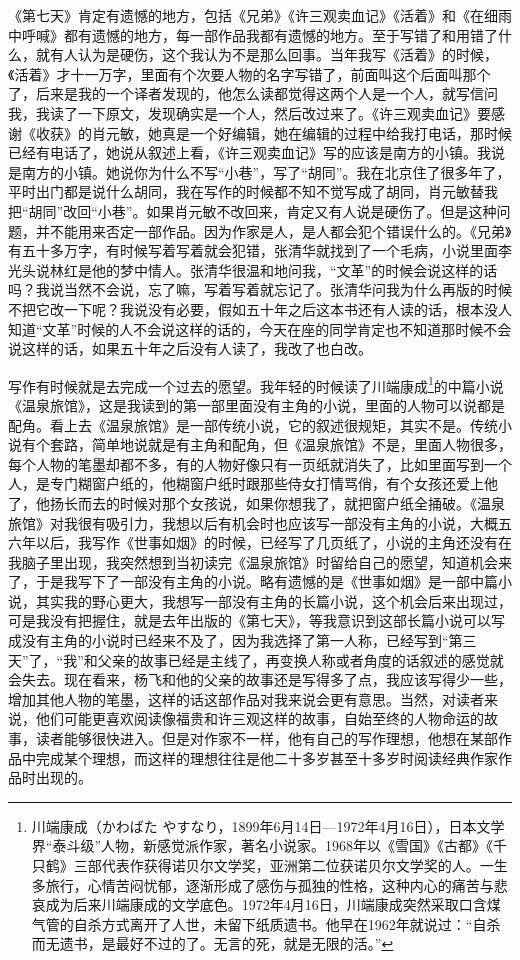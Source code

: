 \documentclass[fontset=fandol,12pt,a5paper]{ctexbook}
\begin{document}
《第七天》肯定有遗憾的地方，包括《兄弟》《许三观卖血记》《活着》和《在细雨中呼喊》都有遗憾的地方，每一部作品我都有遗憾的地方。至于写错了和用错了什么，就有人认为是硬伤，这个我认为不是那么回事。当年我写《活着》的时候，《活着》才十一万字，里面有个次要人物的名字写错了，前面叫这个后面叫那个了，后来是我的一个译者发现的，他怎么读都觉得这两个人是一个人，就写信问我，我读了一下原文，发现确实是一个人，然后改过来了。《许三观卖血记》要感谢《收获》的肖元敏，她真是一个好编辑，她在编辑的过程中给我打电话，那时候已经有电话了，她说从叙述上看，《许三观卖血记》写的应该是南方的小镇。我说是南方的小镇。她说你为什么不写“小巷”，写了“胡同”。我在北京住了很多年了，平时出门都是说什么胡同，我在写作的时候都不知不觉写成了胡同，肖元敏替我把“胡同”改回“小巷”。如果肖元敏不改回来，肯定又有人说是硬伤了。但是这种问题，并不能用来否定一部作品。因为作家是人，是人都会犯个错误什么的。《兄弟》有五十多万字，有时候写着写着就会犯错，张清华就找到了一个毛病，小说里面李光头说林红是他的梦中情人。张清华很温和地问我，“文革”的时候会说这样的话吗？我说当然不会说，忘了嘛，写着写着就忘记了。张清华问我为什么再版的时候不把它改一下呢？我说没有必要，假如五十年之后这本书还有人读的话，根本没人知道“文革”时候的人不会说这样的话的，今天在座的同学肯定也不知道那时候不会说这样的话，如果五十年之后没有人读了，我改了也白改。

写作有时候就是去完成一个过去的愿望。我年轻的时候读了川端康成\footnote{川端康成（かわばた やすなり，1899年6月14日—1972年4月16日），日本文学界“泰斗级”人物，新感觉派作家，著名小说家。1968年以《雪国》《古都》《千只鹤》三部代表作获得诺贝尔文学奖，亚洲第二位获诺贝尔文学奖的人。一生多旅行，心情苦闷忧郁，逐渐形成了感伤与孤独的性格，这种内心的痛苦与悲哀成为后来川端康成的文学底色。1972年4月16日，川端康成突然采取口含煤气管的自杀方式离开了人世，未留下纸质遗书。他早在1962年就说过：“自杀而无遗书，是最好不过的了。无言的死，就是无限的活。”}的中篇小说《温泉旅馆》，这是我读到的第一部里面没有主角的小说，里面的人物可以说都是配角。看上去《温泉旅馆》是一部传统小说，它的叙述很规矩，其实不是。传统小说有个套路，简单地说就是有主角和配角，但《温泉旅馆》不是，里面人物很多，每个人物的笔墨却都不多，有的人物好像只有一页纸就消失了，比如里面写到一个人，是专门糊窗户纸的，他糊窗户纸时跟那些侍女打情骂俏，有个女孩还爱上他了，他扬长而去的时候对那个女孩说，如果你想我了，就把窗户纸全捅破。《温泉旅馆》对我很有吸引力，我想以后有机会时也应该写一部没有主角的小说，大概五六年以后，我写作《世事如烟》的时候，已经写了几页纸了，小说的主角还没有在我脑子里出现，我突然想到当初读完《温泉旅馆》时留给自己的愿望，知道机会来了，于是我写下了一部没有主角的小说。略有遗憾的是《世事如烟》是一部中篇小说，其实我的野心更大，我想写一部没有主角的长篇小说，这个机会后来出现过，可是我没有把握住，就是去年出版的《第七天》，等我意识到这部长篇小说可以写成没有主角的小说时已经来不及了，因为我选择了第一人称，已经写到“第三天”了，“我”和父亲的故事已经是主线了，再变换人称或者角度的话叙述的感觉就会失去。现在看来，杨飞和他的父亲的故事还是写得多了点，我应该写得少一些，增加其他人物的笔墨，这样的话这部作品对我来说会更有意思。当然，对读者来说，他们可能更喜欢阅读像福贵和许三观这样的故事，自始至终的人物命运的故事，读者能够很快进入。但是对作家不一样，他有自己的写作理想，他想在某部作品中完成某个理想，而这样的理想往往是他二十多岁甚至十多岁时阅读经典作家作品时出现的。
\end{document}
